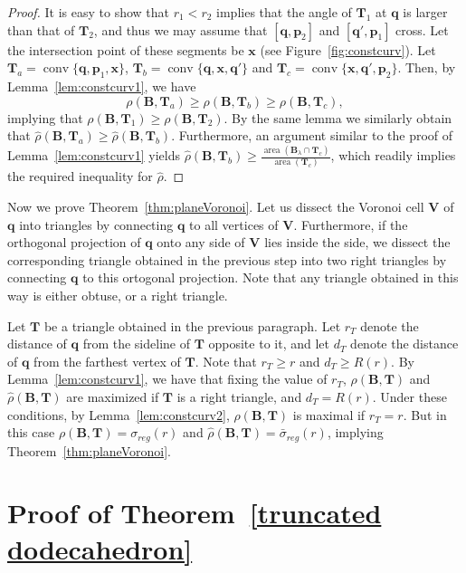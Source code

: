 \documentclass[11pt]{amsart}
\newcommand{\BB}{\mathbf{B}}
\newcommand{\x}{\mathbf{x}}
\newcommand{\q}{\mathbf{q}}
\newcommand{\p}{\mathbf{p}}
\newcommand{\VV}{\mathbf{V}}
\newcommand{\TT}{\mathbf{T}}
\DeclareMathOperator{\conv}{conv}
\DeclareMathOperator{\area}{area}
\theoremstyle{definition}
\numberwithin{equation}{section}
\begin{document}
\begin{proof}
It is easy to show that $r_1 < r_2$ implies that the angle of $\TT_1$ at $\q$ is larger than that of $\TT_2$, and thus we may assume that $[\q,\p_2]$ and $[\q',\p_1]$ cross. Let the intersection point of these segments be $\x$ (see Figure~\ref{fig:constcurv}). Let $\TT_a=\conv \{ \q,\p_1,\x \}$, $\TT_b = \conv \{ \q, \x, \q' \}$ and $\TT_c = \conv \{ \x, \q', \p_2 \}$. Then, by Lemma~\ref{lem:constcurv1}, we have
\[
\rho(\BB,\TT_a) \geq \rho(\BB,\TT_b) \geq \rho(\BB,\TT_c),
\]
implying that $\rho(\BB,\TT_1) \geq \rho(\BB,\TT_2)$. By the same lemma we similarly obtain that $\hat{\rho}(\BB,\TT_a) \geq \hat{\rho}(\BB,\TT_b)$. Furthermore, an argument similar to the proof of Lemma~\ref{lem:constcurv1} yields $\hat{\rho}(\BB,\TT_b) \geq \frac{\area(\BB_{\lambda} \cap \TT_c)}{\area(\TT_c)}$, which readily implies the required inequality for $\hat{\rho}$.
\end{proof}

Now we prove Theorem~\ref{thm:planeVoronoi}.
Let us dissect the Voronoi cell $\VV$ of $\q$ into triangles by connecting $\q$ to all vertices of $\VV$. Furthermore, if the orthogonal projection of $\q$ onto any side of $\VV$ lies inside the side, we dissect the corresponding triangle obtained in the previous step into two right triangles by connecting $\q$ to this ortogonal projection. Note that any triangle obtained in this way is either obtuse, or a right triangle.

Let $\TT$ be a triangle obtained in the previous paragraph. Let $r_T$ denote the distance of $\q$ from the sideline of $\TT$ opposite to it, and let $d_T$ denote the distance of $\q$ from the farthest vertex of $\TT$. Note that $r_T \geq r$ and $d_T \geq R(r)$.
By Lemma~\ref{lem:constcurv1}, we have that fixing the value of $r_T$, $\rho(\BB,\TT)$ and $\hat{\rho}(\BB,\TT)$ are maximized if $\TT$ is a right triangle, and $d_T= R(r)$. Under these conditions, by Lemma~\ref{lem:constcurv2}, $\rho(\BB,\TT)$ is maximal if $r_T=r$. But in this case $\rho(\BB,\TT) = \sigma_{reg}(r)$ and $\hat{\rho}(\BB,\TT) = \bar{\sigma}_{reg}(r)$, implying Theorem~\ref{thm:planeVoronoi}.





\section{Proof of Theorem~\ref{truncated dodecahedron}}
\end{document}
